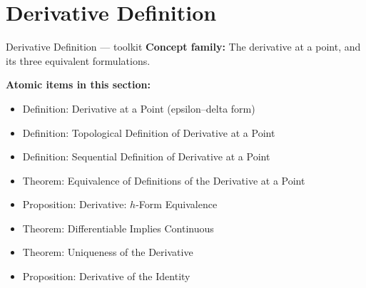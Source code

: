 \section{Derivative Definition}

\begin{toolkitbox}{Derivative Definition --- toolkit}
\textbf{Concept family:} The derivative at a point, and its three equivalent formulations.

\medskip
\textbf{Atomic items in this section:}
\begin{itemize}
  \item Definition: Derivative at a Point (epsilon--delta form)
  \item Definition: Topological Definition of Derivative at a Point
  \item Definition: Sequential Definition of Derivative at a Point
  \item Theorem: Equivalence of Definitions of the Derivative at a Point
  \item Proposition: Derivative: $h$-Form Equivalence
  \item Theorem: Differentiable Implies Continuous
  \item Theorem: Uniqueness of the Derivative
  \item Proposition: Derivative of the Identity
\end{itemize}
\end{toolkitbox}


